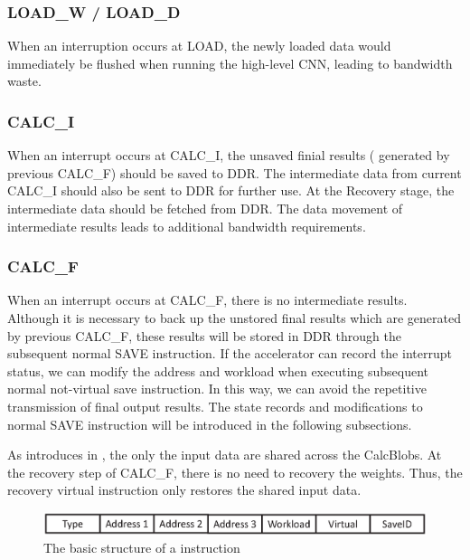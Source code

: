 \subsubsection{LOAD\_W / LOAD\_D }
When an interruption occurs at LOAD, the newly loaded data would immediately be flushed when running the high-level CNN, leading to bandwidth waste.

\subsubsection{CALC\_I} 
When an interrupt occurs at CALC\_I, the unsaved finial results ( generated by previous CALC\_F) should be saved to DDR. The intermediate data from current CALC\_I should also be sent to DDR for further use. At the Recovery stage, the intermediate data should be fetched from DDR. The data movement of intermediate results leads to additional bandwidth requirements.


\subsubsection{CALC\_F}
When an interrupt occurs at CALC\_F, there is no intermediate results. Although it is necessary to back up the unstored final results which are generated by previous CALC\_F, these results will be stored in DDR through the subsequent normal SAVE instruction.
If the accelerator can record the interrupt status, we can modify the address and workload when executing subsequent normal not-virtual save instruction.
In this way, we can avoid the repetitive transmission of final output results.
The state records and modifications to normal SAVE instruction will be introduced in the following subsections.

As introduces in , the only the input data are shared across the CalcBlobs. At the recovery step of CALC\_F, there is no need to recovery the weights. Thus, the recovery virtual instruction only restores the shared input data.

\begin{figure}[h]
	\centering
	\includegraphics[width=0.99\linewidth]{fig/virtual_instr.eps}
	\caption{The basic structure of a instruction }
	\label{fig:virtual_instr}
\end{figure}



